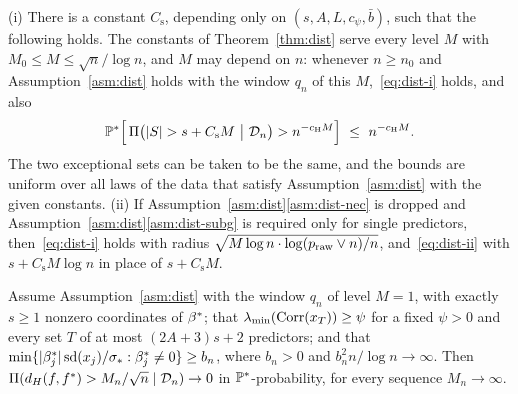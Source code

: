 \begin{proposition}\label{prop:dist}
\textup{(i)} There is a constant $C_{\mathrm s}$, depending only on $(s,A,L,c_\psi,\bar b)$, such that the following holds. The
constants of Theorem~\ref{thm:dist} serve every level $M$ with $M_0\le M\le\sqrt n/\log n$, and $M$ may depend on $n$:
whenever $n\ge n_0$ and Assumption~\ref{asm:dist} holds with the window $q_n$ of this $M$,~\eqref{eq:dist-i} holds, and also
\begin{equation}\label{eq:dist-ii}
  \P^*\Big[\,\Pi\big(\abs{S}>s+C_{\mathrm s}M\ \big|\ \Dn\big)>n^{-c_{\mathrm H} M}\Big]\ \le\ n^{-c_{\mathrm H} M}.
\end{equation}
The two exceptional sets can be taken to be the same, and the bounds are uniform over all laws of the data that satisfy
Assumption~\ref{asm:dist} with the given constants.
\textup{(ii)} If Assumption~\ref{asm:dist}\ref{asm:dist-nec} is dropped and Assumption~\ref{asm:dist}\ref{asm:dist-subg} is
required only for single predictors, then~\eqref{eq:dist-i} holds with radius $\sqrt{M\log n\cdot\log(\praw\vee n)/n}$,
and~\eqref{eq:dist-ii} with $s+C_{\mathrm s}M\log n$ in place of $s+C_{\mathrm s}M$.
\end{proposition}



\begin{theorem}\label{thm:dist-param}
Assume Assumption~\ref{asm:dist} with the window $q_n$ of level $M=1$, with exactly $s\ge1$ nonzero coordinates of $\bstar$;
that $\lmin(\Corr(x_T))\ge\psi$ for a fixed $\psi>0$ and every set $T$ of at most $(2A+3)s+2$ predictors; and that
$\min\{\abs{\beta^*_j}\sd(x_j)/\sigs:\beta^*_j\neq0\}\ge b_n$, where $b_n>0$ and $b_n^2n/\log n\to\infty$. Then
$\Pi(d_H(f,f^*)>M_n/\sqrt n\mid\Dn)\to0$ in $\P^*$-probability, for every sequence $M_n\to\infty$.
\end{theorem}



